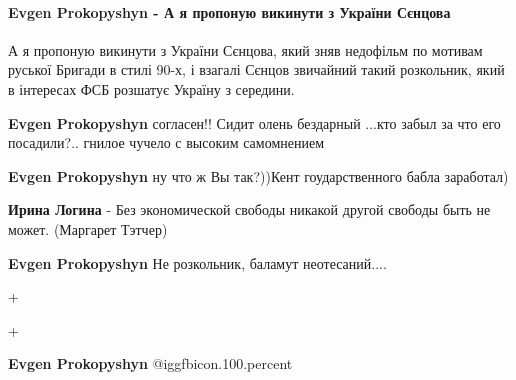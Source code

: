  
 
 
 
 
\paragraph{Evgen Prokopyshyn - А я пропоную викинути з України Сєнцова}
\label{sec:27_09_2021.fb.sentsov_oleg.1.usik.cmt.2.prokopyshyn_sencov_vykinutj}

\begin{itemize} %

А я пропоную викинути з України Сєнцова, який зняв недофільм по мотивам руської
Бригади в стилі 90-х, і взагалі Сєнцов звичайний такий розкольник, який в
інтересах ФСБ розшатує Україну з середини.

\begin{itemize} %
\textbf{Evgen Prokopyshyn} согласен!! Сидит олень бездарный ...кто забыл за что его посадили?.. гнилое чучело с высоким самомнением

\textbf{Evgen Prokopyshyn} ну что ж Вы так?))Кент гоударственного бабла заработал)

\textbf{Ирина Логина} - Без экономической свободы никакой другой свободы быть не может. (Маргарет Тэтчер)

\textbf{Evgen Prokopyshyn} Не розкольник, баламут неотесаний....

+

+

\textbf{Evgen Prokopyshyn}  @igg{fbicon.100.percent} 
\end{itemize} %


\par


\end{itemize}
